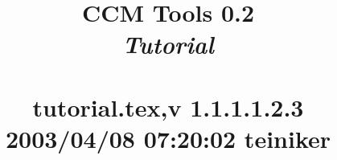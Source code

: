 \documentclass[times,10pt]{report}
\begin{document}
\title{
\vspace{1cm} {\Huge CCM Tools 0.2} \\
\vspace{1cm} {\Huge \it Tutorial} \\
\vspace{1cm}{\it Leif M. Johnson, Egon Teiniker}\\
\vspace{0.5cm} {\small tutorial.tex,v 1.1.1.1.2.3 2003/04/08 07:20:02 teiniker}}


\maketitle
\tableofcontents





\begin{appendix}


\end{appendix}




\end{document}
